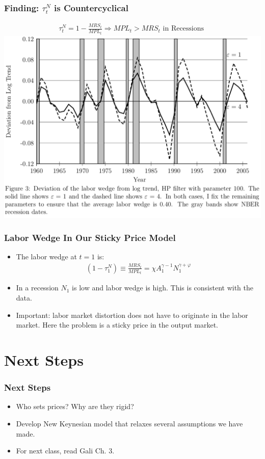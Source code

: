 \documentclass[english,xcolor=svgnames]{beamer}
\begin{document}
\begin{frame}
\frametitle{Finding: $\tau_t^N$ is Countercyclical}
	\begin{align*}
		\tau_t^N = 1- \frac{MRS_t}{MPL_t} \Rightarrow MPL_t>MRS_t \text{ in Recessions }
	\end{align*}
	\centering
	\includegraphics[scale=0.5]{../../Images/Shimer2009laborwedge.png}
\end{frame}

\begin{frame}
\frametitle{Labor Wedge In Our Sticky Price Model}
\begin{itemize}
	\item The labor wedge at $t=1$ is:
	\begin{align*}
		(1-\tau_1^N)\equiv\frac{MRS_t}{MPL_t}=\chi A_1^{\gamma-1}   N_1^{\gamma + \varphi} 
	\end{align*}
	\item In a recession $N_1$ is low and labor wedge is high. This is consistent with the data.
	\item Important: labor market distortion does not have to originate in the labor market. Here the problem is a sticky price in the output market.
\end{itemize}
\end{frame}



\section{Next Steps}

\begin{frame}
\frametitle{Next Steps
}
\begin{itemize}
	\item Who sets prices? Why are they rigid?
	\item Develop New Keynesian model that relaxes several assumptions we have made.
	\item For next class, read Gali Ch. 3. 
\end{itemize}
\end{frame}
\end{document}
